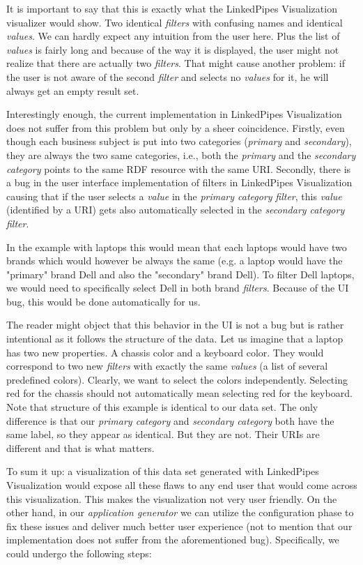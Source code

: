 It is important to say that this is exactly what the LinkedPipes Visualization visualizer would show. Two identical \emph{filters} with confusing names and identical \emph{values}. We can hardly expect any intuition from the user here. Plus the list of \emph{values} is fairly long and because of the way it is displayed, the user might not realize that there are actually two \emph{filters}. That might cause another problem: if the user is not aware of the second \emph{filter} and selects no \emph{values} for it, he will always get an empty result set.

Interestingly enough, the current implementation in LinkedPipes Visualization does not suffer from this problem but only by a sheer coincidence. Firstly, even though each business subject is put into two categories (\emph{primary} and \emph{secondary}), they are always the two same categories, i.e., both the \emph{primary} and the \emph{secondary category} points to the same RDF resource with the same URI. Secondly, there is a bug in the  user interface implementation of filters in LinkedPipes Visualization causing that if the user selects a \emph{value} in the \emph{primary category} \emph{filter}, this \emph{value} (identified by a URI) gets also automatically selected in the \emph{secondary category} \emph{filter}.

In the example with laptops this would mean that each laptops would have two brands which would however be always the same (e.g. a laptop would have the "primary" brand Dell and also the "secondary" brand Dell). To filter Dell laptops, we would need to specifically select Dell in both brand \emph{filters}. Because of the UI bug, this would be done automatically for us.

The reader might object that this behavior in the UI is not a bug but is rather intentional as it follows the structure of the data. Let us imagine that a laptop has two new properties. A chassis color and a keyboard color. They would correspond to two new \emph{filters} with exactly the same \emph{values} (a list of several predefined colors). Clearly, we want to select the colors independently. Selecting red for the chassis should not automatically mean selecting red for the keyboard. Note that structure of this example is identical to our data set. The only difference is that our \emph{primary category} and \emph{secondary category} both have the same label, so they appear as identical. But they are not. Their URIs are different and that is what matters.

To sum it up: a visualization of this data set generated with LinkedPipes Visualization would expose all these flaws to any end user that would come across this visualization. This makes the visualization not very user friendly. On the other hand, in our \emph{application generator} we can utilize the configuration phase to fix these issues and deliver much better user experience (not to mention that our implementation does not suffer from the aforementioned bug). Specifically, we could undergo the following steps:

